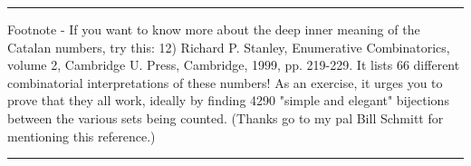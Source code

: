 \par\noindent\rule{\textwidth}{0.4pt}
Footnote - If you want to know more about the deep inner meaning
of the Catalan numbers, try this:
12) Richard P. Stanley, Enumerative Combinatorics, volume 2,
Cambridge U. Press, Cambridge, 1999, pp. 219-229.
It lists 66 different combinatorial interpretations of these
numbers!  As an exercise, it urges you to prove that they all
work, ideally by finding 4290 "simple and elegant" bijections
between the various sets being counted.  
(Thanks go to my pal Bill Schmitt for mentioning this reference.)






 \par\noindent\rule{\textwidth}{0.4pt}

